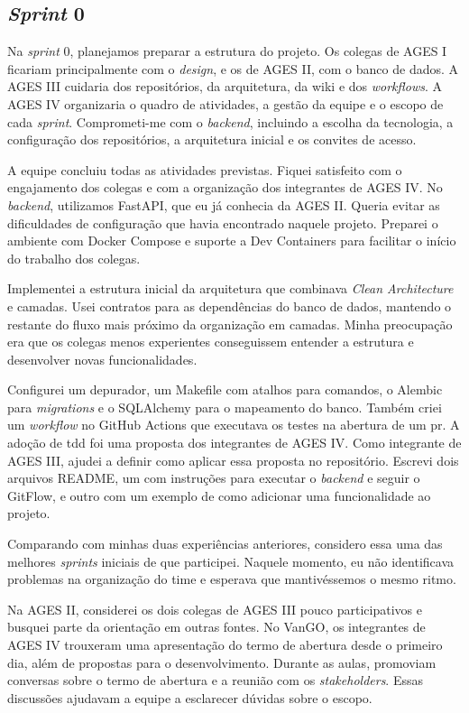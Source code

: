 \subsection{\textit{Sprint} 0}

Na \textit{sprint} 0, planejamos preparar a estrutura do projeto. Os colegas de
AGES I ficariam principalmente com o \textit{design}, e os de AGES II, com o
banco de dados. A AGES III cuidaria dos repositórios, da arquitetura, da wiki e
dos \textit{workflows}. A AGES IV organizaria o quadro de atividades, a gestão
da equipe e o escopo de cada \textit{sprint}. Comprometi-me com o
\textit{backend}, incluindo a escolha da tecnologia, a configuração dos
repositórios, a arquitetura inicial e os convites de acesso.

A equipe concluiu todas as atividades previstas. Fiquei satisfeito com o
engajamento dos colegas e com a organização dos integrantes de AGES IV. No
\textit{backend}, utilizamos FastAPI, que eu já conhecia da AGES II. Queria
evitar as dificuldades de configuração que havia encontrado naquele projeto.
Preparei o ambiente com Docker Compose \cite{docker-docs} e suporte a Dev
Containers para facilitar o início do trabalho dos colegas.

Implementei a estrutura inicial da arquitetura que combinava
\textit{Clean Architecture} e camadas. Usei contratos para as dependências do
banco de dados, mantendo o restante do fluxo mais próximo da organização em
camadas. Minha preocupação era que os colegas menos experientes conseguissem
entender a estrutura e desenvolver novas funcionalidades.

Configurei um depurador, um Makefile com atalhos para comandos, o Alembic para
\textit{migrations} e o SQLAlchemy para o mapeamento do banco. Também criei um
\textit{workflow} no GitHub Actions que executava os testes na abertura de um
\ac{pr}. A adoção de \ac{tdd} foi uma proposta dos integrantes de AGES IV.
Como integrante de AGES III, ajudei a definir como aplicar essa proposta no
repositório. Escrevi dois arquivos README, um com instruções para executar o
\textit{backend} e seguir o GitFlow, e outro com um exemplo de como adicionar
uma funcionalidade ao projeto.

Comparando com minhas duas experiências anteriores, considero essa uma das
melhores \textit{sprints} iniciais de que participei. Naquele momento, eu não
identificava problemas na organização do time e esperava que mantivéssemos o
mesmo ritmo.

Na AGES II, considerei os dois colegas de AGES III pouco participativos e
busquei parte da orientação em outras fontes. No VanGO, os integrantes de
AGES IV trouxeram uma apresentação do termo de abertura desde o primeiro dia,
além de propostas para o desenvolvimento. Durante as aulas, promoviam
conversas sobre o termo de abertura e a reunião com os \textit{stakeholders}.
Essas discussões ajudavam a equipe a esclarecer dúvidas sobre o escopo.

